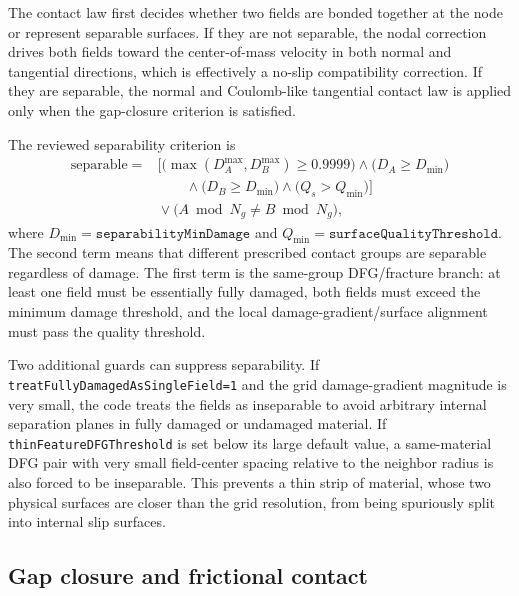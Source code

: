 The contact law first decides whether two fields are bonded together at the node or represent separable surfaces.  If they are not separable, the nodal correction drives both fields toward the center-of-mass velocity in both normal and tangential directions, which is effectively a no-slip compatibility correction.  If they are separable, the normal and Coulomb-like tangential contact law is applied only when the gap-closure criterion is satisfied.

The reviewed separability criterion is
\begin{equation}
\begin{aligned}
  \mathrm{separable} ={}&
  \Big[\big(\max(D_A^{\max},D_B^{\max})\ge 0.9999\big)
  \land \big(D_A\ge D_{\min}\big) \\
  &\qquad {}
  \land \big(D_B\ge D_{\min}\big)
  \land \big(Q_s>Q_{\min}\big)\Big] \\
  &{}\lor \big(A\bmod N_g\ne B\bmod N_g\big),
  \label{eq:contact-separability}
\end{aligned}
\end{equation}
where $D_{\min}=\texttt{separabilityMinDamage}$ and $Q_{\min}=\texttt{surfaceQualityThreshold}$.  The second term means that different prescribed contact groups are separable regardless of damage.  The first term is the same-group DFG/fracture branch: at least one field must be essentially fully damaged, both fields must exceed the minimum damage threshold, and the local damage-gradient/surface alignment must pass the quality threshold.

Two additional guards can suppress separability.  If \texttt{treatFullyDamagedAsSingleField=1} and the grid damage-gradient magnitude is very small, the code treats the fields as inseparable to avoid arbitrary internal separation planes in fully damaged or undamaged material.  If \texttt{thinFeatureDFGThreshold} is set below its large default value, a same-material DFG pair with very small field-center spacing relative to the neighbor radius is also forced to be inseparable.  This prevents a thin strip of material, whose two physical surfaces are closer than the grid resolution, from being spuriously split into internal slip surfaces.

\subsection{Gap closure and frictional contact}
\label{subsec:contact-gap-closure}

